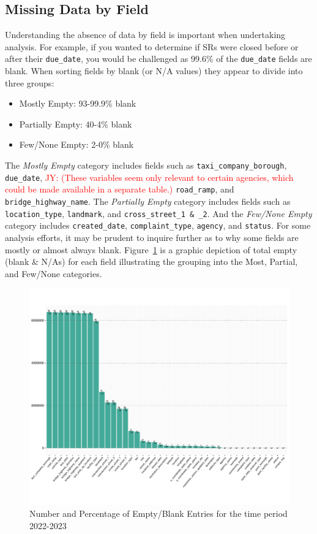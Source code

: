 \documentclass[linenumber]{jdsart}
\newcommand{\jy}[1]{\textcolor{red}{JY: (#1)}}
\begin{document}
\subsection{Missing Data by Field}
\label{sec:blanks}
Understanding the absence of data by field is important 
when undertaking analysis. For example, if you wanted to 
determine if SRs were closed before or after their
\texttt{due\_date}, you would be challenged as 99.6\% of the
\texttt{due\_date} fields are blank. When sorting fields by
blank (or N/A values) they appear to divide into three groups:

\begin{itemize}[left=1.5em]
    \item Mostly Empty: 93-99.9\% blank 
    \item Partially Empty: 40-4\% blank
    \item Few/None Empty: 2-0\% blank
\end{itemize}

The \textit{Mostly Empty} category includes fields such as
\texttt{taxi\_company\_borough}, \texttt{due\_date},
\jy{These variables seem only relevant to certain agencies, which
  could be made available in a separate table.}
\texttt{road\_ramp}, and \texttt{bridge\_highway\_name}.
The \textit{Partially Empty} category includes fields such as
\texttt{location\_type}, \texttt{landmark}, 
and \texttt{cross\_street\_1 \& \_2}. And the \textit{Few/None Empty} 
category includes \texttt{created\_date}, \texttt{complaint\_type},
\texttt{agency}, and \texttt{status}. For some analysis efforts, it may be
prudent to inquire further as to why some fields are 
mostly or almost always blank. Figure~\ref{fig:blank_fields} is 
a graphic depiction of total empty (blank \& N/As) for each 
field illustrating the grouping into 
the Most, Partial, and Few/None categories.

\begin{figure}[tbp]
	\centering
  	\includegraphics[width=\textwidth]{BlankFields.pdf}
	\caption{Number and Percentage of Empty/Blank Entries for the time period 2022-2023}
	\label{fig:blank_fields}
\end{figure}
\end{document}
